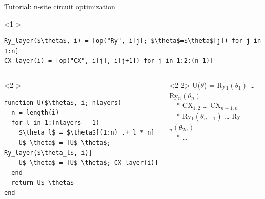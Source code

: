 \begin{frame}[fragile]{Tutorial: n-site circuit optimization}

\begin{onlyenv}<1->
\begin{lstlisting}[language=JuliaLocal, style=julia, mathescape, basicstyle=\small]
Ry_layer($\theta$, i) = [op("Ry", i[j]; $\theta$=$\theta$[j]) for j in 1:n]
CX_layer(i) = [op("CX", i[j], i[j+1]) for j in 1:2:(n-1)]
\end{lstlisting}
\end{onlyenv}

\begin{columns}

\begin{column}{5cm}

\begin{onlyenv}<2->
\begin{lstlisting}[language=JuliaLocal, style=julia, mathescape, basicstyle=\small]
function U($\theta$, i; nlayers)
  n = length(i)
  for l in 1:(nlayers - 1)
    $\theta_l$ = $\theta$[(1:n) .+ l * n]
    U$_\theta$ = [U$_\theta$; Ry_layer($\theta_l$, i)]
    U$_\theta$ = [U$_\theta$; CX_layer(i)]
  end
  return U$_\theta$
end
\end{lstlisting}
\end{onlyenv}

\end{column}

\begin{column}{5.5cm}

\begin{onlyenv}<2-2>
U($\theta$) = Ry$_1(\theta_1)$ … Ry$_n(\theta_n)$ \\
\ \ *           CX$_{1,2}$ … CX$_{n-1,n}$ \\
\ \ *          Ry$_1(\theta_{n+1})$ … Ry$_n(\theta_{2n})$ \\
\ \ *           …
~\\
~\\
~\\
~\\
~\\
~\\
\end{onlyenv}


\end{column}
\end{columns}
\end{frame}
